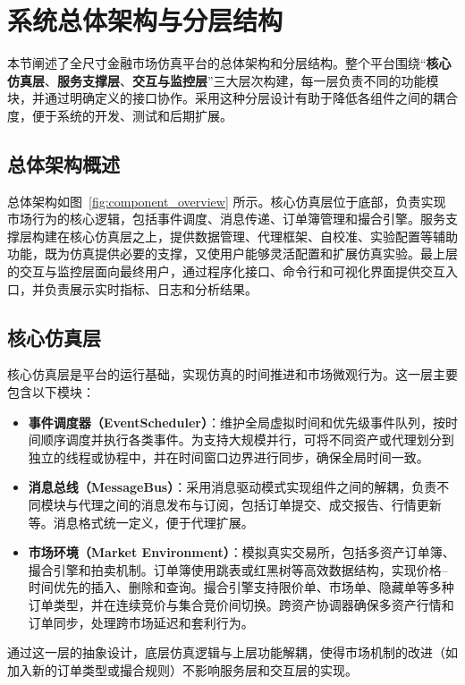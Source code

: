 \section{系统总体架构与分层结构}

本节阐述了全尺寸金融市场仿真平台的总体架构和分层结构。整个平台围绕“\textbf{核心仿真层}、\textbf{服务支撑层}、\textbf{交互与监控层}”三大层次构建，每一层负责不同的功能模块，并通过明确定义的接口协作。采用这种分层设计有助于降低各组件之间的耦合度，便于系统的开发、测试和后期扩展。

\subsection{总体架构概述}

总体架构如图~\ref{fig:component_overview} 所示。核心仿真层位于底部，负责实现市场行为的核心逻辑，包括事件调度、消息传递、订单簿管理和撮合引擎。服务支撑层构建在核心仿真层之上，提供数据管理、代理框架、自校准、实验配置等辅助功能，既为仿真提供必要的支撑，又使用户能够灵活配置和扩展仿真实验。最上层的交互与监控层面向最终用户，通过程序化接口、命令行和可视化界面提供交互入口，并负责展示实时指标、日志和分析结果。

\subsection{核心仿真层}

核心仿真层是平台的运行基础，实现仿真的时间推进和市场微观行为。这一层主要包含以下模块：

\begin{itemize}
  \item \textbf{事件调度器（EventScheduler）}：维护全局虚拟时间和优先级事件队列，按时间顺序调度并执行各类事件。为支持大规模并行，可将不同资产或代理划分到独立的线程或协程中，并在时间窗口边界进行同步，确保全局时间一致。
  \item \textbf{消息总线（MessageBus）}：采用消息驱动模式实现组件之间的解耦，负责不同模块与代理之间的消息发布与订阅，包括订单提交、成交报告、行情更新等。消息格式统一定义，便于代理扩展。
  \item \textbf{市场环境（Market Environment）}：模拟真实交易所，包括多资产订单簿、撮合引擎和拍卖机制。订单簿使用跳表或红黑树等高效数据结构，实现价格–时间优先的插入、删除和查询。撮合引擎支持限价单、市场单、隐藏单等多种订单类型，并在连续竞价与集合竞价间切换。跨资产协调器确保多资产行情和订单同步，处理跨市场延迟和套利行为。
\end{itemize}

通过这一层的抽象设计，底层仿真逻辑与上层功能解耦，使得市场机制的改进（如加入新的订单类型或撮合规则）不影响服务层和交互层的实现。

